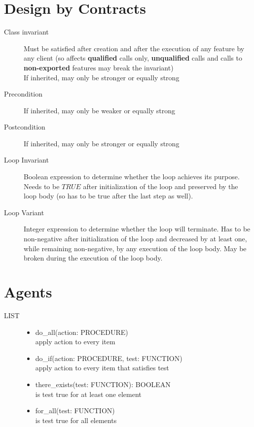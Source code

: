 \documentclass[11pt]{article}
\begin{document}
\section{Design by Contracts}

\begin{description}
	\item[Class invariant] Must be satisfied after creation and after the execution of any feature by any client (so affects \textbf{qualified} calls only, \textbf{unqualified} calls and calls to \textbf{non-exported} features may break the invariant) \\
		If inherited, may only be stronger or equally strong
	\item[Precondition] If inherited, may only be weaker or equally strong
	\item[Postcondition] If inherited, may only be stronger or equally strong
	\item[Loop Invariant] Boolean expression to determine whether the loop achieves its purpose. Needs to be $TRUE$ after initialization of the loop and preserved by the loop body (so has to be true after the last step as well).
	\item[Loop Variant] Integer expression to determine whether the loop will terminate. Has to be non-negative after initialization of the loop and decreased by at least one, while remaining non-negative, by any execution of the loop body. May be broken during the execution of the loop body.
\end{description}

\section{Agents}

\begin{description}
	\item[LIST]
	\begin{itemize}
		\item do\_all(action: PROCEDURE) \\ apply action to every item
		\item do\_if(action: PROCEDURE, test: FUNCTION) \\ apply action to every item that satisfies test
		\item there\_exists(test: FUNCTION): BOOLEAN \\ is test true for at least one element
		\item for\_all(test: FUNCTION) \\ is test true for all elements
	\end{itemize}
\end{description}
\end{document}
